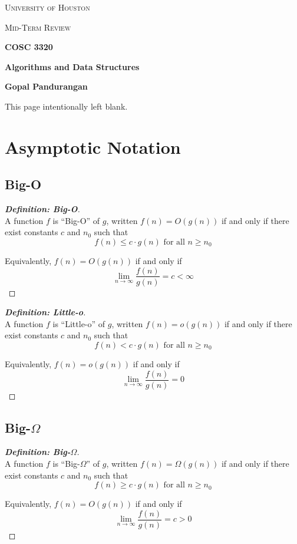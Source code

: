 \documentclass[a4paper]{article}
\newenvironment{definition}[1]{\begin{proof}[\textnormal{\textbf{Definition: #1}}]\mbox{}\\\phantom{\qedhere}}{\end{proof}}
\theoremstyle{definition}
\begin{document}
\begin{titlepage}
	\centering
	{\scshape\LARGE University of Houston\par}
	\vspace{1cm}
	{\scshape\Large Mid-Term Review \par}
	\vspace{1.5cm}
	{\huge\bfseries COSC 3320 \par}
	{\huge\bfseries Algorithms and Data Structures\par}
	\vspace{0.5cm}
	{\large\bfseries Gopal Pandurangan\par}
	\vspace{2cm}
	\vfill

\end{titlepage}
\vspace*{\fill}\begin{center}{\Huge This page intentionally left blank.}\end{center}\vspace*{\fill}\thispagestyle{empty}\clearpage
{}
\section{Asymptotic Notation}
\subsection{Big-O}
 \begin{definition}{Big-O}
  A function $f$ is ``Big-O'' of $g$, written $f(n)=O(g(n))$ if and only if there exist constants $c$ and $n_0$ such that \[f(n)\leq c\cdot g(n)\text{ for all }n\geq n_0\] 
  
  Equivalently, $f(n)=O(g(n))$ if and only if \[\lim_{n\to\infty}\frac{f(n)}{g(n)}=c<\infty\]
 \end{definition}
 
  \begin{definition}{Little-o}
  A function $f$ is ``Little-o'' of $g$, written $f(n)=o(g(n))$ if and only if there exist constants $c$ and $n_0$ such that \[f(n)< c\cdot g(n)\text{ for all }n\geq n_0\] 
  
  Equivalently, $f(n)=o(g(n))$ if and only if \[\lim_{n\to\infty}\frac{f(n)}{g(n)}=0\]
 \end{definition}

\subsection{Big-$\Omega$}
 \begin{definition}{Big-$\Omega$}
  A function $f$ is ``Big-$\Omega$'' of $g$, written $f(n)=\Omega(g(n))$ if and only if there exist constants $c$ and $n_0$ such that \[f(n)\geq c\cdot g(n)\text{ for all }n\geq n_0\] 
  
  Equivalently, $f(n)=O(g(n))$ if and only if \[\lim_{n\to\infty}\frac{f(n)}{g(n)}=c>0\]
 \end{definition}
 
\end{document}
